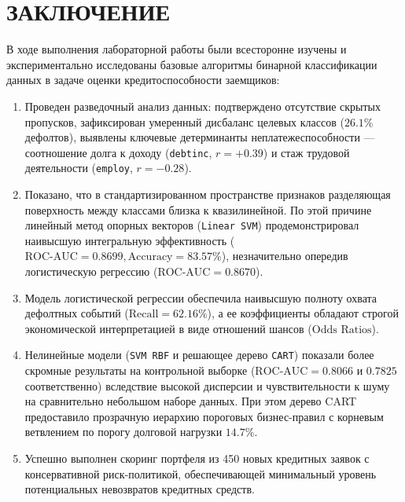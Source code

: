 \documentclass[14pt,a4paper]{extarticle}
\begin{document}
\section*{ЗАКЛЮЧЕНИЕ}

В ходе выполнения лабораторной работы были всесторонне изучены и экспериментально исследованы базовые алгоритмы бинарной классификации данных в задаче оценки кредитоспособности заемщиков:
\begin{enumerate}
  \item Проведен разведочный анализ данных: подтверждено отсутствие скрытых пропусков, зафиксирован умеренный дисбаланс целевых классов ($26.1\%$ дефолтов), выявлены ключевые детерминанты неплатежеспособности --- соотношение долга к доходу (\texttt{debtinc}, $r = +0.39$) и стаж трудовой деятельности (\texttt{employ}, $r = -0.28$).
  \item Показано, что в стандартизированном пространстве признаков разделяющая поверхность между классами близка к квазилинейной. По этой причине линейный метод опорных векторов (\texttt{Linear SVM}) продемонстрировал наивысшую интегральную эффективность ($\text{ROC-AUC} = 0.8699, \text{Accuracy} = 83.57\%$), незначительно опередив логистическую регрессию ($\text{ROC-AUC} = 0.8670$).
  \item Модель логистической регрессии обеспечила наивысшую полноту охвата дефолтных событий ($\text{Recall} = 62.16\%$), а ее коэффициенты обладают строгой экономической интерпретацией в виде отношений шансов ($\text{Odds Ratios}$).
  \item Нелинейные модели (\texttt{SVM RBF} и решающее дерево \texttt{CART}) показали более скромные результаты на контрольной выборке ($\text{ROC-AUC} = 0.8066$ и $0.7825$ соответственно) вследствие высокой дисперсии и чувствительности к шуму на сравнительно небольшом наборе данных. При этом дерево CART предоставило прозрачную иерархию пороговых бизнес-правил с корневым ветвлением по порогу долговой нагрузки $14.7\%$.
  \item Успешно выполнен скоринг портфеля из 450 новых кредитных заявок с консервативной риск-политикой, обеспечивающей минимальный уровень потенциальных невозвратов кредитных средств.
\end{enumerate}

\end{document}
